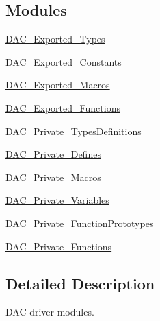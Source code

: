 \subsection*{Modules}
\begin{DoxyCompactItemize}
\item 
\hyperlink{group___d_a_c___exported___types}{D\+A\+C\+\_\+\+Exported\+\_\+\+Types}
\item 
\hyperlink{group___d_a_c___exported___constants}{D\+A\+C\+\_\+\+Exported\+\_\+\+Constants}
\item 
\hyperlink{group___d_a_c___exported___macros}{D\+A\+C\+\_\+\+Exported\+\_\+\+Macros}
\item 
\hyperlink{group___d_a_c___exported___functions}{D\+A\+C\+\_\+\+Exported\+\_\+\+Functions}
\item 
\hyperlink{group___d_a_c___private___types_definitions}{D\+A\+C\+\_\+\+Private\+\_\+\+Types\+Definitions}
\item 
\hyperlink{group___d_a_c___private___defines}{D\+A\+C\+\_\+\+Private\+\_\+\+Defines}
\item 
\hyperlink{group___d_a_c___private___macros}{D\+A\+C\+\_\+\+Private\+\_\+\+Macros}
\item 
\hyperlink{group___d_a_c___private___variables}{D\+A\+C\+\_\+\+Private\+\_\+\+Variables}
\item 
\hyperlink{group___d_a_c___private___function_prototypes}{D\+A\+C\+\_\+\+Private\+\_\+\+Function\+Prototypes}
\item 
\hyperlink{group___d_a_c___private___functions}{D\+A\+C\+\_\+\+Private\+\_\+\+Functions}
\end{DoxyCompactItemize}


\subsection{Detailed Description}
D\+AC driver modules. 

